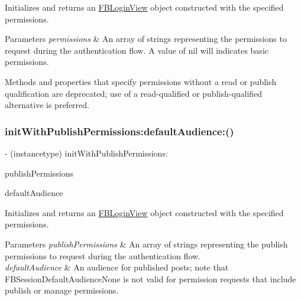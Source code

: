 Initializes and returns an {\ttfamily \hyperlink{interfaceFBLoginView}{F\+B\+Login\+View}} object constructed with the specified permissions.


\begin{DoxyParams}{Parameters}
{\em permissions} & An array of strings representing the permissions to request during the authentication flow. A value of nil will indicates basic permissions.\\
\hline
\end{DoxyParams}
Methods and properties that specify permissions without a read or publish qualification are deprecated; use of a read-\/qualified or publish-\/qualified alternative is preferred. \mbox{\label{interfaceFBLoginView_a937f55736400541dc0f21fe01d6a8b96}} 
\subsubsection{\texorpdfstring{init\+With\+Publish\+Permissions\+:default\+Audience\+:()}{initWithPublishPermissions:defaultAudience:()}\hspace{0.1cm}{\footnotesize\ttfamily [1/5]}}
{\footnotesize\ttfamily -\/ (instancetype) init\+With\+Publish\+Permissions\+: \begin{DoxyParamCaption}\item[{(N\+S\+Array $\ast$)}]{publish\+Permissions }\item[{defaultAudience:(F\+B\+Session\+Default\+Audience)}]{default\+Audience }\end{DoxyParamCaption}}

Initializes and returns an {\ttfamily \hyperlink{interfaceFBLoginView}{F\+B\+Login\+View}} object constructed with the specified permissions.


\begin{DoxyParams}{Parameters}
{\em publish\+Permissions} & An array of strings representing the publish permissions to request during the authentication flow.\\
\hline
{\em default\+Audience} & An audience for published posts; note that F\+B\+Session\+Default\+Audience\+None is not valid for permission requests that include publish or manage permissions. \\
\hline
\end{DoxyParams}
\mbox{\label{interfaceFBLoginView_a937f55736400541dc0f21fe01d6a8b96}} 
